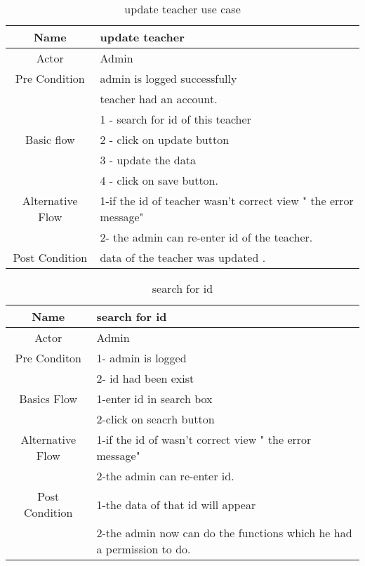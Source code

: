 \documentclass{article}
\begin{document}
	\begin{table}[!h]
		
		\caption{update teacher use case }
		\centering
		\label{updateteacherfunction}
		
		\begin{tabular}{|c|l|}
			\hline
			Name                 & update teacher \\
			\hline
			Actor                & Admin  \\
			\hline
			Pre Condition        & admin is logged successfully \\
			                     & teacher had an account.\\
			
			\hline
		
			               & 1 - search for id of this teacher \\
			Basic flow     & 2 - click on update button \\
			               & 3 - update the data\\
			               & 4 - click on save button.\\
			\hline
			 
			
			Alternative Flow & 1-if the id of teacher wasn't correct view " the error message"\\
		                     & 2- the admin can  re-enter id of the teacher. \\
			\hline
			
			Post Condition      & data of the teacher was updated . \\
			
			\hline
			
		\end{tabular}
		
	\end{table}
	
	\begin{table}[!h]
		\caption{search for id}
		\centering
		\label{search for id}
		\begin{tabular}{|c|l|}
			\hline
			Name             & search for id\\
			\hline
			Actor            &Admin\\
			\hline
			Pre Conditon     &1- admin is logged\\
			                 &2- id had been exist\\
			\hline
			                 
			Basics Flow      &1-enter id in search box\\
			                 &2-click on seacrh button\\
			\hline
			Alternative Flow &1-if the id of  wasn't correct view " the error message" \\
			               & 2-the admin can  re-enter id.
			\\
			\hline
			Post Condition   &1-the data of that id  will appear \\
			                 &2-the admin now can do the functions which he had a permission to do.\\
			\hline
		\end{tabular}
	\end{table}
	
\end{document}
